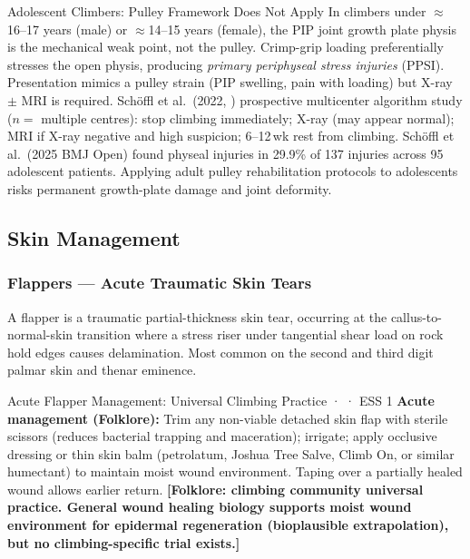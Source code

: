 \begin{warningbox}{Adolescent Climbers: Pulley Framework Does Not Apply}
In climbers under $\approx$16--17 years (male) or $\approx$14--15 years (female), the PIP joint growth plate physis is the mechanical weak point, not the pulley. Crimp-grip loading preferentially stresses the open physis, producing \textit{primary periphyseal stress injuries} (PPSI). Presentation mimics a pulley strain (PIP swelling, pain with loading) but X-ray $\pm$ MRI is required. Sch\"{o}ffl et al.\ (2022, \cite{SSF+21}) prospective multicenter algorithm study ($n=$ multiple centres): stop climbing immediately; X-ray (may appear normal); MRI if X-ray negative and high suspicion; 6--12\,wk rest from climbing. Sch\"{o}ffl et al.\ (2025 BMJ Open) found physeal injuries in 29.9\% of 137 injuries across 95 adolescent patients. Applying adult pulley rehabilitation protocols to adolescents risks permanent growth-plate damage and joint deformity.
\end{warningbox}

\subsection{Skin Management}
\label{subsec:skin}

\subsubsection{Flappers --- Acute Traumatic Skin Tears}

A flapper is a traumatic partial-thickness skin tear, occurring at the callus-to-normal-skin transition where a stress riser under tangential shear load on rock hold edges causes delamination. Most common on the second and third digit palmar skin and thenar eminence.

\begin{folklorebox}{Acute Flapper Management: Universal Climbing Practice · \folkloreverified · ESS 1}
\textbf{Acute management (Folklore):} Trim any non-viable detached skin flap with sterile scissors (reduces bacterial trapping and maceration); irrigate; apply occlusive dressing or thin skin balm (petrolatum, Joshua Tree Salve, Climb On, or similar humectant) to maintain moist wound environment. Taping over a partially healed wound allows earlier return. \textbf{[Folklore: climbing community universal practice. General wound healing biology supports moist wound environment for epidermal regeneration (bioplausible extrapolation), but no climbing-specific trial exists.]}
\end{folklorebox}


